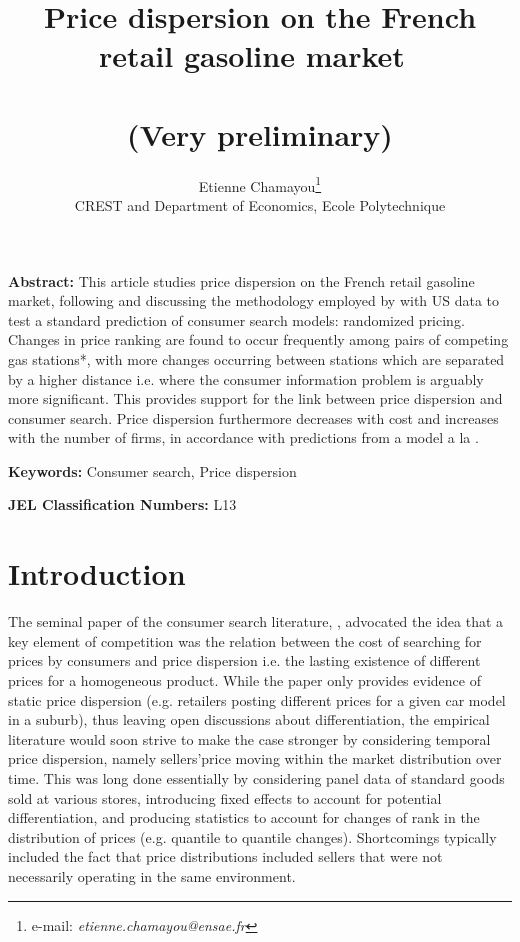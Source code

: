 \documentclass[11pt]{article}
\begin{document}
\title{Price dispersion on the French retail gasoline market\ \\ \ \\(Very preliminary)}
\author{Etienne Chamayou\thanks{e-mail:
\textit{etienne.chamayou@ensae.fr}}\medskip\\{\normalsize CREST and Department of Economics, Ecole Polytechnique }}
\maketitle

\sloppy%

\onehalfspacing

\textbf{Abstract:}
This article studies price dispersion on the French retail gasoline market, following and discussing the methodology employed by \cite{TAP11} with US data to test a standard prediction of consumer search models: randomized pricing. Changes in price ranking are found to occur frequently among pairs of competing gas stations*, with more changes occurring between stations which are separated by a higher distance i.e. where the consumer information problem is arguably more significant. This provides support for the link between price dispersion and consumer search. Price dispersion furthermore decreases with cost and increases with the number of firms, in accordance with predictions from a model a la \cite{VAR80}.

\strut

\textbf{Keywords:} Consumer search, Price dispersion

\strut

\textbf{JEL Classification Numbers:} L13

\pagebreak%
\doublespacing

\section{Introduction}
\setcounter{page}{1}

The seminal paper of the consumer search literature, \cite{STI61}, advocated the idea that a key element of competition was the relation between the cost of searching for prices by consumers and price dispersion i.e. the lasting existence of different prices for a homogeneous product. While the paper only provides evidence of static price dispersion (e.g. retailers posting different prices for a given car model in a suburb), thus leaving open discussions about differentiation, the empirical literature would soon strive to make the case stronger by considering temporal price dispersion, namely sellers'price moving within the market distribution over time. This was long done essentially by considering panel data of standard goods sold at various stores, introducing fixed effects to account for potential differentiation, and producing statistics to account for changes of rank in the distribution of prices (e.g. quantile to quantile changes). Shortcomings typically included the fact that price distributions included sellers that were not necessarily operating in the same environment.
\end{document}

